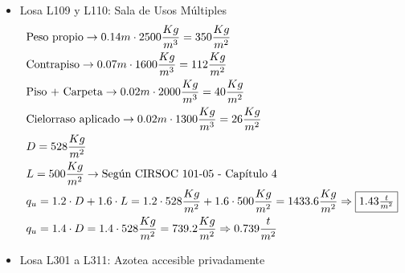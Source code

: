 \begin{enumerate}
\begin{itemize}
\item Losa L109 y L110: Sala de Usos Múltiples
\begin{align*}
& \text{Peso propio} \rightarrow 0.14m \cdot 2500 \frac{Kg}{m^3} = 350 \frac{Kg}{m^2}\\
& \text{Contrapiso} \rightarrow 0.07m \cdot 1600 \frac{Kg}{m^3} = 112 \frac{Kg}{m^2}\\
& \text{Piso + Carpeta} \rightarrow 0.02m \cdot 2000 \frac{Kg}{m^3} = 40 \frac{Kg}{m^2}\\
& \text{Cielorraso aplicado} \rightarrow  0.02m \cdot 1300 \frac{Kg}{m^3} = 26 \frac{Kg}{m^2}\\
& D = 528 \frac{Kg}{m^2}\\
& L = 500 \frac{Kg}{m^2} \rightarrow \text{Según CIRSOC 101-05 - Capítulo 4}\\
& q_u = 1.2 \cdot D + 1.6 \cdot L = 1.2 \cdot 528 \frac{Kg}{m^2} + 1.6 \cdot 500 \frac{Kg}{m^2} = 1433.6 \frac{Kg}{m^2} \Rightarrow \framebox{$1.43 \frac{t}{m^2}$} \\
& q_u = 1.4 \cdot D = 1.4 \cdot 528 \frac{Kg}{m^2} = 739.2 \frac{Kg}{m^2} \Rightarrow 0.739 \frac{t}{m^2}
\end{align*}

\item Losa L301 a L311: Azotea accesible privadamente


\end{itemize}
\end{enumerate}
